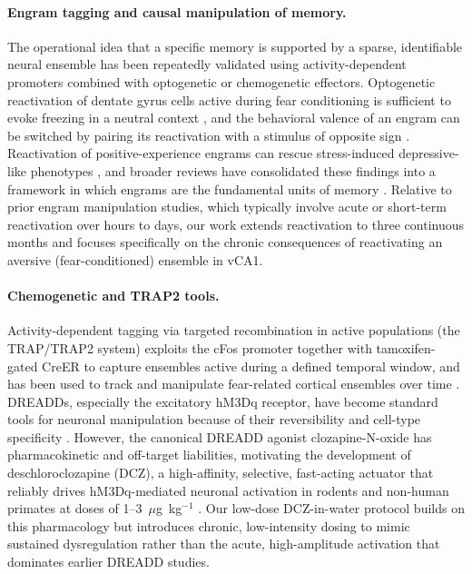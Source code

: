 \paragraph{Engram tagging and causal manipulation of memory.} The operational idea that a specific memory is supported by a sparse, identifiable neural ensemble has been repeatedly validated using activity-dependent promoters combined with optogenetic or chemogenetic effectors. Optogenetic reactivation of dentate gyrus cells active during fear conditioning is sufficient to evoke freezing in a neutral context \cite{liu2012engram}, and the behavioral valence of an engram can be switched by pairing its reactivation with a stimulus of opposite sign \cite{redondo2014valence}. Reactivation of positive-experience engrams can rescue stress-induced depressive-like phenotypes \cite{ramirez2015positive}, and broader reviews have consolidated these findings into a framework in which engrams are the fundamental units of memory \cite{josselyn2020engram}. Relative to prior engram manipulation studies, which typically involve acute or short-term reactivation over hours to days, our work extends reactivation to three continuous months and focuses specifically on the chronic consequences of reactivating an aversive (fear-conditioned) ensemble in vCA1.

\paragraph{Chemogenetic and TRAP2 tools.} Activity-dependent tagging via targeted recombination in active populations (the TRAP/TRAP2 system) exploits the cFos promoter together with tamoxifen-gated CreER to capture ensembles active during a defined temporal window, and has been used to track and manipulate fear-related cortical ensembles over time \cite{denardo2019temporal}. DREADDs, especially the excitatory hM3Dq receptor, have become standard tools for neuronal manipulation because of their reversibility and cell-type specificity \cite{roth2016dreadds}. However, the canonical DREADD agonist clozapine-N-oxide has pharmacokinetic and off-target liabilities, motivating the development of deschloroclozapine (DCZ), a high-affinity, selective, fast-acting actuator that reliably drives hM3Dq-mediated neuronal activation in rodents and non-human primates at doses of 1--3~$\mu$g~kg$^{-1}$ \cite{nagai2020dcz}. Our low-dose DCZ-in-water protocol builds on this pharmacology but introduces chronic, low-intensity dosing to mimic sustained dysregulation rather than the acute, high-amplitude activation that dominates earlier DREADD studies.


